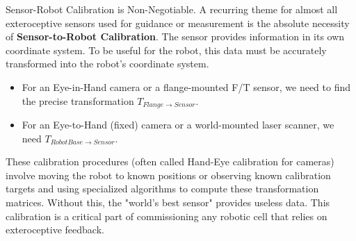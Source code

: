 \begin{principlebox}{Sensor-Robot Calibration is Non-Negotiable.}
    A recurring theme for almost all exteroceptive sensors used for guidance or measurement is the absolute necessity of \textbf{Sensor-to-Robot Calibration}. The sensor provides information in its own coordinate system. To be useful for the robot, this data must be accurately transformed into the robot's coordinate system.
    \begin{itemize}
        \item For an Eye-in-Hand camera or a flange-mounted F/T sensor, we need to find the precise transformation \(T_{Flange \to Sensor}\).
        \item For an Eye-to-Hand (fixed) camera or a world-mounted laser scanner, we need \(T_{RobotBase \to Sensor}\).
    \end{itemize}
    These calibration procedures (often called Hand-Eye calibration for cameras) involve moving the robot to known positions or observing known calibration targets and using specialized algorithms to compute these transformation matrices. Without this, the "world's best sensor" provides useless data. This calibration is a critical part of commissioning any robotic cell that relies on exteroceptive feedback.
\end{principlebox}

